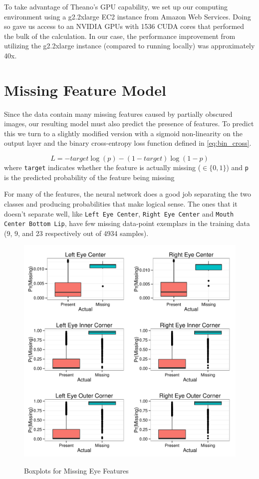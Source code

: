 \documentclass[journal]{IEEEtran}
\begin{document}
To take advantage of Theano's GPU capability, we set up our computing environment using a g2.2xlarge EC2 instance from Amazon Web Services. Doing so gave us access to an NVIDIA GPUs with 1536 CUDA cores that performed the bulk of the calculation. In our case, the performance improvement from utilizing the g2.2xlarge instance (compared to running locally) was approximately 40x.

\section{Missing Feature Model}

Since the data contain many missing features caused by partially obscured images, our resulting model must also predict the presence of features.  To predict this we turn to a slightly modified version with a sigmoid non-linearity on the output layer and the binary cross-entropy loss function defined in \cref{eq:bin_cross}.

\[\label{eq:bin_cross}
 L = -target \log(p) - (1 - target) \log(1 - p)
\]
where \texttt{target} indicates whether the feature is actually missing ($\in \{0,1\}$) and \texttt{p} is the predicted probability of the feature being missing

For many of the features, the neural network does a good job separating the two classes and producing probabilities that make logical sense.  The ones that it doesn't separate well, like \texttt{Left Eye Center}, \texttt{Right Eye Center} and \texttt{Mouth Center Bottom Lip}, have few missing data-point exemplars in the training data (9, 9, and 23 respectively out of 4934 samples).

\begin{figure}[!ht]
  \centering
  \caption{Boxplots for Missing Eye Features}
  \includegraphics[scale=.5]{logistic_boxplots_eye.pdf}
  \label{fig:logistic_boxplots_eye}
\end{figure}
\end{document}
